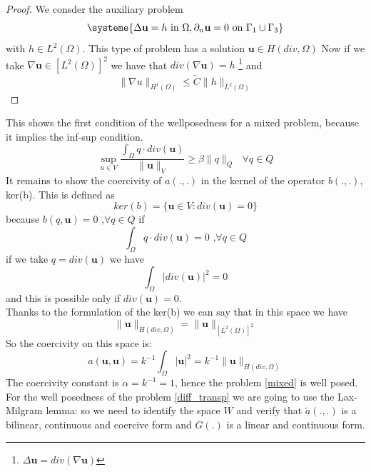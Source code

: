 \documentclass[]{report}
\begin{document}
\begin{proof}
	We consder the auxiliary problem
	\begin{equation*}
		\systeme{\Delta \mathbf{u}=h \mbox{ in } \Omega, \partial_n \mathbf{u}=0 \mbox{ on } \Gamma_1\cup\Gamma_3}
	\end{equation*}
	with $h \in L^2(\Omega)$. This type of problem has a solution $\mathbf{u}\in H(div,\Omega)$
	Now if we take $\nabla\mathbf{u}\in [L^2(\Omega)]^2$ we have that $div(\nabla \mathbf{u})=h$  \footnote{$\Delta \mathbf{u}=div(\nabla\mathbf{u})$}
	 and
	\begin{equation*}
	\|\nabla u\|_{H^1(\Omega)}\leq \tilde{C}\|h\|_{L^2(\Omega)}
	\end{equation*}
\end{proof}
This shows the first condition of the wellposedness for a mixed problem, because it implies the inf-sup condition.
\begin{equation}
	\sup_{u\in V}\frac{\int_\Omega q \cdot div(\mathbf{u})}{\|\mathbf{u}\|_V}\geq \beta \|q\|_Q \mbox{  }\forall q\in Q
	\label{infsup}
\end{equation} 
It remains to show the coercivity of $a(.,.)$ in the kernel of the operator $b(.,.)$, ker(b). This is defined as
\begin{equation}
	ker(b)=\{\mathbf{u} \in V: div(\mathbf{u})=0 \}
	\label{kernel}
\end{equation}
because $b(q,\mathbf{u})=0\mbox{ ,}\forall q\in Q$ if
\begin{equation*}
	\int_\Omega q\cdot div(\mathbf{u})=0 \mbox{ ,}\forall q\in Q
\end{equation*}
if we take $q=div(\mathbf{u})$ we have
\begin{equation*}
	\int_\Omega |div(\mathbf{u})|^2=0
\end{equation*}
and this is possible only if $div(\mathbf{u})=0$.\\
Thanks to the formulation of the ker(b) we can say that in this space we have
\begin{equation}
	\|\mathbf{u}\|_{H(div,\Omega)}=\|\mathbf{u}\|_{[L^2(\Omega)]^2}
\end{equation}
So the coercivity on this space is:
\begin{equation}
	a(\mathbf{u},\mathbf{u})=k^{-1}\int_\Omega |\mathbf{u}|^2=k^{-1}\|\mathbf{u}\|_{H(div,\Omega)}
\end{equation}
The coercivity constant is $\alpha=k^{-1}=1$, hence the problem \eqref{mixed} is well posed.\\
For the well posedness of the problem \eqref{diff_transp} we are going to use the Lax-Milgram lemma: so we need to identify the space $W$ and verify that $\tilde{a}(.,.)$ is a bilinear, continuous and coercive form and $G(.)$ is a linear and continuous form.
\end{document}
